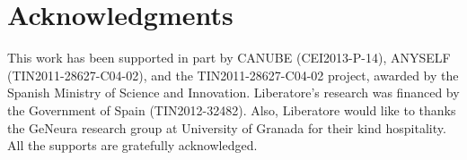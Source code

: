 \documentclass[a4paper]{llncs}
\begin{document}
%
%

\section*{Acknowledgments}
This work has been supported in part by CANUBE (CEI2013-P-14), ANYSELF (TIN2011-28627-C04-02), and the TIN2011-28627-C04-02 project, awarded by the Spanish Ministry of Science and Innovation. Liberatore's research was financed by the Government of Spain (TIN2012-32482). Also, Liberatore would like to thanks the GeNeura research group at University of Granada for their kind hospitality. All the supports are gratefully acknowledged.




\end{document}
